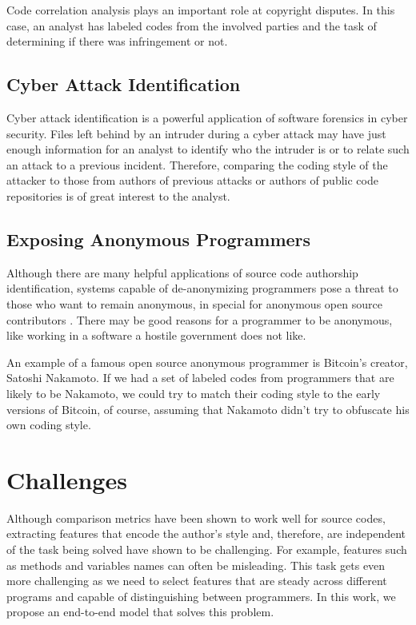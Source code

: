 Code correlation analysis plays an important role at copyright disputes. In this case, an analyst has labeled codes from the involved parties and the task of determining if there was infringement or not.

\subsection{Cyber Attack Identification}

Cyber attack identification is a powerful application of software forensics in cyber security. Files left behind by an intruder during a cyber attack may have just enough information for an analyst to identify who the intruder is or to relate such an attack to a previous incident. Therefore, comparing the coding style of the attacker to those from authors of previous attacks or authors of public code repositories is of great interest to the analyst.

\subsection{Exposing Anonymous Programmers}

Although there are many helpful applications of source code authorship identification, systems capable of de-anonymizing programmers pose a threat to those who want to remain anonymous, in special for anonymous open source contributors \cite{gitblame}. There may be good reasons for a programmer to be anonymous, like working in a software a hostile government does not like. 

An example of a famous open source anonymous programmer is Bitcoin's creator, Satoshi Nakamoto. If we had a set of labeled codes from programmers that are likely to be Nakamoto, we could try to match their coding style to the early versions of Bitcoin, of course, assuming that Nakamoto didn't try to obfuscate his own coding style.

\section{Challenges}

Although comparison metrics have been shown to work well for source codes, extracting features that encode the author's style and, therefore, are independent of the task being solved have shown to be challenging. For example, features such as methods and variables names can often be misleading. This task gets even more challenging as we need to select features that are steady across different programs and capable of distinguishing between programmers. In this work, we propose an end-to-end model that solves this problem.

